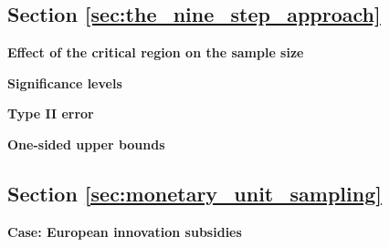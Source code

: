\subsection{Section \ref{sec:the_nine_step_approach}}

\begin{exercise}
\label{ex:critical_region}

\textbf{Effect of the critical region on the sample size}





\end{exercise}

\begin{exercise}
\label{ex:probability_of_sample_results}

\textbf{Significance levels}



\end{exercise}

\begin{exercise}
\label{ex:type_two}

\textbf{Type II error}



\end{exercise}

\begin{exercise}
\label{ex:upper_bounds}

\textbf{One-sided upper bounds}



\end{exercise}

\subsection{Section \ref{sec:monetary_unit_sampling}}

\begin{exercise}
\label{ex:subsidies}

\textbf{Case: European innovation subsidies}





\end{exercise}

